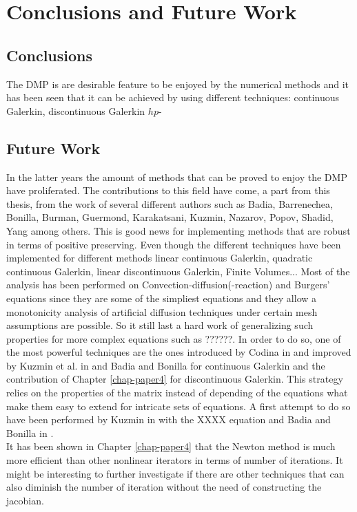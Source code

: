 \chapter{Conclusions and Future Work}

\section{Conclusions}

The DMP is are desirable feature to be enjoyed by the numerical methods and it has been seen that it can be achieved by using different techniques: continuous Galerkin, discontinuous Galerkin $hp$-

\section{Future Work}
In the latter years the amount of methods that can be proved to enjoy the DMP have proliferated. The contributions to this field have come, a part from this thesis, from the work of several different authors such as  Badia, Barrenechea, Bonilla, Burman, Guermond, Karakatsani, Kuzmin,  Nazarov, Popov, Shadid, Yang  \cite{barrenechea_blending_2015,guermond_second-order_2014,guermod_nazarov_2014,kuzmin_gradient-based_2016,jesus} among others. This is good news for implementing methods that are robust in terms of positive preserving. Even though the different techniques have been implemented for different methods linear continuous Galerkin, quadratic continuous Galerkin, linear discontinuous Galerkin, Finite Volumes... Most of the analysis has been performed on Convection-diffusion(-reaction) and Burgers' equations since they are some of the simpliest equations and they allow a monotonicity analysis of artificial diffusion techniques under certain mesh assumptions are possible. So it still last a hard work of generalizing such properties for more complex equations such as ??????. In order to do so, one of the most powerful techniques are the ones introduced by Codina in \cite{codina_discontinuity-capturing_1993} and improved by Kuzmin et al. in \cite{kuzmin_flux-corrected_2005} and Badia and Bonilla \cite{jesus} for continuous Galerkin and the contribution of Chapter \ref{chap-paper4} for discontinuous Galerkin. This strategy relies on the properties of the matrix instead of depending of the equations what make them easy to extend for intricate sets of equations. A first attempt to do so have been performed by Kuzmin in \cite{???} with the XXXX equation and Badia and Bonilla in \cite{jesus}.\\

It has been shown in Chapter \ref{chap-paper4} that the Newton method is much more efficient than other nonlinear iterators in terms of number of iterations. It might be interesting to further investigate if there are other techniques that can also diminish the number of iteration without the need of constructing the jacobian. 